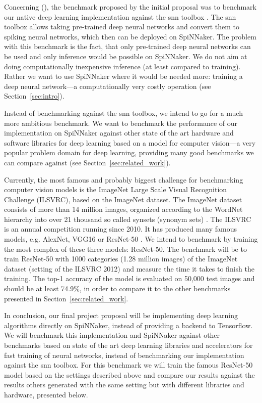 \documentclass{article}
\begin{document}
Concerning (), the benchmark proposed by the
initial proposal was to benchmark our native deep learning
implementation against the snn toolbox
\citep{rueckauer_et_al_2017}.
The snn toolbox allows taking pre-trained deep neural
networks and convert them to spiking neural networks, which
then can be deployed on SpiNNaker.
The problem with this benchmark is the fact, that only
pre-trained deep neural networks can be used and only
inference would be possible on SpiNNaker.
We do not aim at doing computationally inexpensive inference
(at least compared to training).
Rather we want to use SpiNNaker where it would be needed more:
training a deep neural network---a computationally very costly
operation (see Section~\ref{sec:intro}).

Instead of benchmarking against the snn toolbox, we intend
to go for a much more ambitious benchmark.
We want to benchmark the performance of our implementation
on SpiNNaker against other state of the art hardware and
software libraries for deep learning based on a model for
computer vision---a very popular problem domain for deep
learning, providing many good benchmarks we can compare
against (see Section~\ref{sec:related_work}).

Currently, the most famous and probably biggest challenge
for benchmarking computer vision models is the
ImageNet Large Scale Visual Recognition Challenge (ILSVRC),
based on the ImageNet dataset.
The ImageNet dataset consists of more than 14 million
images, organized according to the WordNet hierarchy into
over 21 thousand so called synsets (synonym sets)
\citep{imagenet, wordnet}.
The ILSVRC is an annual competition running since 2010.
It has produced many famous models, e.g. AlexNet, VGG16 or
ResNet-50 \citep{alexnet, simonyan_et_al_2014,
  he_et_al_2015}.
We intend to benchmark by training the most complex of
these three models: ResNet-50.
The benchmark will be to train ResNet-50 with 1000
categories (1.28 million images) of the ImageNet dataset
(setting of the ILSVRC 2012) and measure the time it takes
to finish the training.
The top-1 accuracy of the model is evaluated on 50,000 test
images and should be at least 74.9\%, in order to compare
it to the other benchmarks presented in
Section~\ref{sec:related_work}.

In conclusion, our final project proposal will be
implementing deep learning algorithms directly on
SpiNNaker, instead of providing a backend to Tensorflow.
We will benchmark this implementation and SpiNNaker against
other benchmarks based on state of the art deep learning
libraries and accelerators for fast training of neural
networks, instead of benchmarking our implementation
against the snn toolbox.
For this benchmark we will train the famous ResNet-50 model
based on the settings described above and compare our
results against the results others generated with the same
setting but with different libraries and hardware, presented below.
\end{document}
